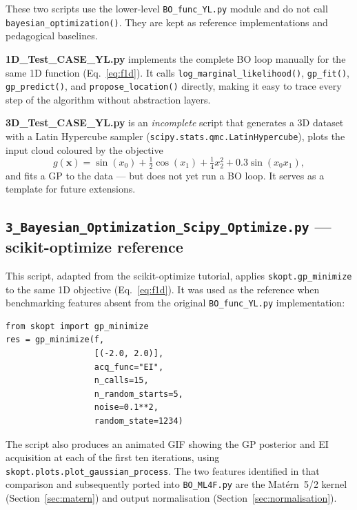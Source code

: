 \documentclass[11pt,a4paper]{article}
\newcommand{\bx}{\bm{x}}
\theoremstyle{remark}
\newcommand{\codefile}[1]{\texttt{#1}}
\newcommand{\codefn}[1]{\texttt{#1()}}
\begin{document}
These two scripts use the lower-level \codefile{BO\_func\_YL.py} module and
do not call \codefn{bayesian\_optimization}.  They are kept as reference
implementations and pedagogical baselines.

\textbf{1D\_Test\_CASE\_YL.py} implements the complete BO loop manually for
the same 1D function (Eq.~\eqref{eq:f1d}).  It calls \codefn{log\_marginal\_likelihood},
\codefn{gp\_fit}, \codefn{gp\_predict}, and \codefn{propose\_location} directly,
making it easy to trace every step of the algorithm without abstraction layers.

\textbf{3D\_Test\_CASE\_YL.py} is an \emph{incomplete} script that generates
a 3D dataset with a Latin Hypercube sampler (\texttt{scipy.stats.qmc.LatinHypercube}),
plots the input cloud coloured by the objective
\[
  g(\bx) = \sin(x_0) + \tfrac{1}{2}\cos(x_1)
          + \tfrac{1}{4}x_2^2 + 0.3\sin(x_0 x_1),
\]
and fits a GP to the data --- but does not yet run a BO loop.  It serves as
a template for future extensions.

\subsection{\texttt{3\_Bayesian\_Optimization\_Scipy\_Optimize.py}
  --- scikit-optimize reference}
\label{sec:exskopt}

This script, adapted from the scikit-optimize tutorial, applies
\texttt{skopt.gp\_minimize} to the same 1D objective (Eq.~\eqref{eq:f1d}).
It was used as the reference when benchmarking features absent from the
original \codefile{BO\_func\_YL.py} implementation:

\begin{lstlisting}[numbers=none, caption=\codefile{3\_Bayesian\_Optimization\_Scipy\_Optimize.py}]
from skopt import gp_minimize
res = gp_minimize(f,
                  [(-2.0, 2.0)],
                  acq_func="EI",
                  n_calls=15,
                  n_random_starts=5,
                  noise=0.1**2,
                  random_state=1234)
\end{lstlisting}

The script also produces an animated GIF showing the GP posterior and EI
acquisition at each of the first ten iterations, using
\texttt{skopt.plots.plot\_gaussian\_process}.  The two features identified
in that comparison and subsequently ported into \codefile{BO\_ML4F.py} are
the Mat\'{e}rn~5/2 kernel (Section~\ref{sec:matern}) and output normalisation
(Section~\ref{sec:normalisation}).
\end{document}
